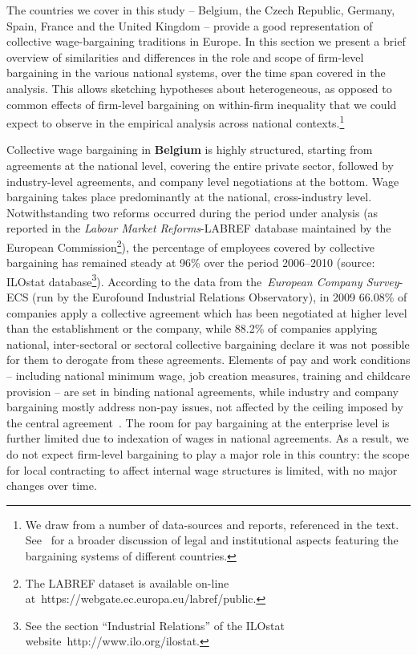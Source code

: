 \documentclass[12pt]{article}
\begin{document}
The countries we cover in this study -- Belgium, the Czech Republic, Germany, Spain, France and the United Kingdom -- provide a good representation of collective wage-bargaining traditions in Europe. In this section we present a brief overview of similarities and differences in the role and scope of firm-level bargaining in the various national systems, over the time span covered in the analysis. This allows  sketching hypotheses about heterogeneous, as opposed to common effects of firm-level bargaining on within-firm inequality that we could expect to observe in the empirical analysis across national contexts.\footnote{We draw from a number of data-sources and reports, referenced in the text. See~\cite{fulton.2013,fulton.2015} for a broader discussion of legal and institutional aspects featuring the bargaining systems of different countries.} 

Collective wage bargaining in \textbf{Belgium} is highly structured, starting from agreements at the national level, covering the entire private sector, followed by industry-level agreements, and company level negotiations at the bottom.
Wage bargaining takes place predominantly at the national, cross-industry level.
Notwithstanding two reforms occurred during the period under analysis (as reported in the \textit{Labour Market Reforms}-LABREF database maintained by the European Commission\footnote{The LABREF dataset is available on-line at~https://webgate.ec.europa.eu/labref/public.}), the percentage of employees covered by collective bargaining has remained steady at 96\% over the period 2006--2010 (source: ILOstat database\footnote{See the section “Industrial Relations” of the ILOstat website~http://www.ilo.org/ilostat.}).
According to the data from the~\textit{European Company Survey}-ECS (run by the Eurofound Industrial Relations Observatory), in 2009 66.08\% of companies apply a collective agreement which has been negotiated at higher level than the establishment or the company, while 88.2\% of companies applying national, inter-sectoral or sectoral collective bargaining declare it was not possible for them to derogate from these agreements. Elements of pay and work conditions -- including national minimum wage, job creation measures, training and childcare provision -- are set in binding national agreements, while industry and company bargaining mostly address non-pay issues, not affected by the ceiling imposed by the central agreement~\citep{visser2013wage}. The room for pay bargaining at the enterprise level is further limited due to indexation of wages in national agreements.
As a result, we do not expect firm-level bargaining to play a major role in this country: the scope for local contracting to affect internal wage structures is limited, with no major changes over time.
\end{document}
